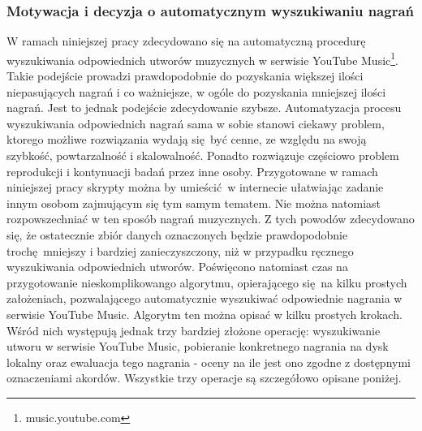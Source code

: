 \subsubsection{Motywacja i decyzja o automatycznym wyszukiwaniu nagrań}
W ramach niniejszej pracy zdecydowano się na automatyczną procedurę wyszukiwania odpowiednich
utworów muzycznych w serwisie YouTube Music\footnote{music.youtube.com}. Takie podejście prowadzi
prawdopodobnie do pozyskania większej ilości niepasujących nagrań i co ważniejsze, w ogóle do
pozyskania mniejszej ilości nagrań. Jest to jednak podejście zdecydowanie szybsze. Automatyzacja
procesu wyszukiwania odpowiednich nagrań sama w sobie stanowi ciekawy problem, ktorego możliwe
rozwiązania wydają się być cenne, ze względu na swoją szybkość, powtarzalność i skalowalność.
Ponadto rozwiązuje częściowo problem reprodukcji i kontynuacji badań przez inne osoby.  Przygotowane
w ramach niniejszej pracy skrypty można by umieścić w internecie ułatwiając zadanie innym osobom
zajmującym się tym samym tematem. Nie można natomiast rozpowszechniać w ten sposób nagrań
muzycznych. Z tych powodów zdecydowano się, że ostatecznie zbiór danych oznaczonych będzie
prawdopodobnie trochę mniejszy i bardziej zanieczyszczony, niż w przypadku ręcznego wyszukiwania
odpowiednich utworów. Poświęcono natomiast czas na przygotowanie nieskomplikowango algorytmu,
opierającego się na kilku prostych założeniach, pozwalającego automatycznie wyszukiwać odpowiednie
nagrania w serwisie YouTube Music. Algorytm ten można opisać w kilku prostych krokach. Wśród nich
występują jednak trzy bardziej złożone operację: wyszukiwanie utworu w serwisie YouTube Music,
pobieranie konkretnego nagrania na dysk lokalny oraz ewaluacja tego nagrania - oceny na ile jest ono
zgodne z dostępnymi oznaczeniami akordów. Wszystkie trzy operacje są szczegółowo opisane poniżej.

